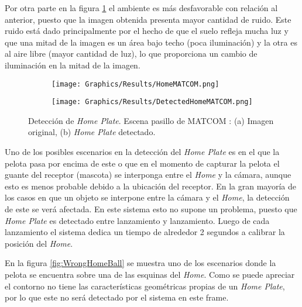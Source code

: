 Por otra parte en la figura \ref{fig:DetectedHomeMATCOM} el ambiente es más desfavorable con relación al anterior, puesto que la imagen obtenida presenta mayor cantidad de ruido. Este ruido está dado principalmente por el hecho de que el suelo refleja mucha luz y que una mitad de la imagen es un área bajo techo (poca iluminación) y la otra es al aire libre (mayor cantidad de luz), lo que proporciona un cambio de iluminación en la mitad de la imagen.

\begin{figure}[h!]
    \centering
    \begin{subfigure}[b]{0.32\linewidth}
        \texttt{[image: Graphics/Results/HomeMATCOM.png]}
        \caption{}
    \end{subfigure}
    \begin{subfigure}[b]{0.32\linewidth}
        \texttt{[image: Graphics/Results/DetectedHomeMATCOM.png]}
        \caption{}
    \end{subfigure}
    \caption{Detección de \textit{Home Plate}. Escena pasillo de MATCOM : (a) Imagen original, (b)\textit{ Home Plate} detectado.}
    \label{fig:DetectedHomeMATCOM}
\end{figure}

Uno de los posibles escenarios en la detección del \textit{Home Plate} es en el que la pelota pasa por encima de este o que en el momento de capturar la pelota el guante del receptor (mascota) se interponga entre el \textit{Home} y la cámara, aunque esto es menos probable debido a la ubicación del receptor. En la gran mayoría de los casos en que un objeto se interpone entre la cámara y el \textit{Home}, la detección de este se verá afectada. En este sistema esto no supone un problema, puesto que \textit{Home Plate} es detectado entre lanzamiento y lanzamiento. Luego de cada lanzamiento el sistema dedica un tiempo de alrededor 2 segundos a calibrar la posición del \textit{Home}.

En la figura \ref{fig:WrongHomeBall} se muestra uno de los escenarios donde la pelota se encuentra sobre una de las esquinas del \textit{Home}. Como se puede apreciar el contorno no tiene las características geométricas propias de un \textit{Home Plate}, por lo que este no será detectado por el sistema en este frame.

